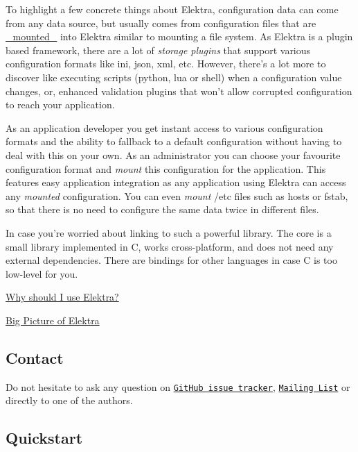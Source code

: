 To highlight a few concrete things about Elektra, configuration data can come from any data source, but usually comes from configuration files that are \hyperlink{md_doc_help_elektra-mounting_doc_help_elektra-mounting_md}{\+\_\+mounted\+\_\+} into Elektra similar to mounting a file system. As Elektra is a plugin based framework, there are a lot of {\itshape storage plugins} that support various configuration formats like ini, json, xml, etc. However, there's a lot more to discover like executing scripts ({\ttfamily python}, {\ttfamily lua} or {\ttfamily shell}) when a configuration value changes, or, enhanced validation plugins that won't allow corrupted configuration to reach your application.

As an application developer you get instant access to various configuration formats and the ability to fallback to a default configuration without having to deal with this on your own. As an administrator you can choose your favourite configuration format and {\itshape mount} this configuration for the application. This features easy application integration as any application using Elektra can access any {\itshape mounted} configuration. You can even {\itshape mount} {\ttfamily /etc} files such as {\ttfamily hosts} or {\ttfamily fstab}, so that there is no need to configure the same data twice in different files.

In case you're worried about linking to such a powerful library. The core is a small library implemented in C, works cross-\/platform, and does not need any external dependencies. There are bindings for other languages in case C is too low-\/level for you.


\begin{DoxyItemize}
\item \hyperlink{doc_WHY_md}{Why should I use Elektra?}
\item \hyperlink{doc_BIGPICTURE_md}{Big Picture of Elektra}
\end{DoxyItemize}

\subsection*{Contact}

Do not hesitate to ask any question on \href{https://github.com/ElektraInitiative/libelektra/issues}{\tt Git\+Hub issue tracker}, \href{https://lists.sourceforge.net/lists/listinfo/registry-list}{\tt Mailing List} or directly to one of the authors.

\subsection*{Quickstart}

